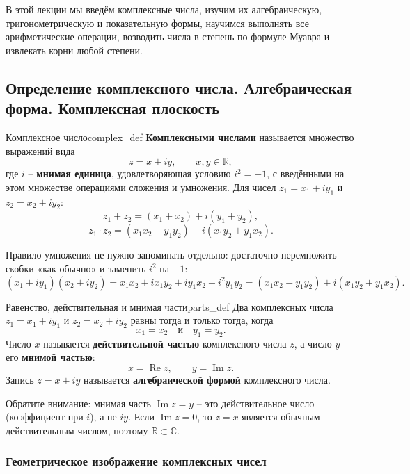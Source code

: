 \documentclass[12pt,a4paper]{article}
\begin{document}
В этой лекции мы введём комплексные числа, изучим их алгебраическую,
тригонометрическую и показательную формы, научимся выполнять все
арифметические операции, возводить числа в степень по формуле Муавра и
извлекать корни любой степени.

\subsection*{Определение комплексного числа. Алгебраическая форма.
Комплексная плоскость}

\begin{definition}{Комплексное число}{complex_def}
  \textbf{Комплексными числами} называется множество выражений вида
  \[
    z = x + iy, \qquad x, y \in \mathbb{R},
  \]
  где $i$ -- \textbf{мнимая единица}, удовлетворяющая условию
  $i^2 = -1$, с введёнными на этом множестве операциями сложения и
  умножения. Для чисел $z_1 = x_1 + iy_1$ и $z_2 = x_2 + iy_2$:
  \[
    z_1 + z_2 = (x_1 + x_2) + i(y_1 + y_2),
  \]
  \[
    z_1 \cdot z_2 = (x_1 x_2 - y_1 y_2) + i(x_1 y_2 + y_1 x_2).
  \]
\end{definition}

Правило умножения не нужно запоминать отдельно: достаточно перемножить
скобки «как обычно» и заменить $i^2$ на $-1$:
\[
  (x_1 + iy_1)(x_2 + iy_2) = x_1 x_2 + i x_1 y_2 + i y_1 x_2 + i^2 y_1 y_2
  = (x_1 x_2 - y_1 y_2) + i(x_1 y_2 + y_1 x_2).
\]

\begin{definition}{Равенство, действительная и мнимая части}{parts_def}
  Два комплексных числа $z_1 = x_1 + iy_1$ и $z_2 = x_2 + iy_2$ равны
  тогда и только тогда, когда
  \[
    x_1 = x_2 \quad \text{и} \quad y_1 = y_2.
  \]
  Число $x$ называется \textbf{действительной частью} комплексного
  числа $z$, а число $y$ -- его \textbf{мнимой частью}:
  \[
    x = \operatorname{Re} z, \qquad y = \operatorname{Im} z.
  \]
  Запись $z = x + iy$ называется \textbf{алгебраической формой}
  комплексного числа.
\end{definition}

Обратите внимание: мнимая часть $\operatorname{Im} z = y$ -- это
действительное число (коэффициент при $i$), а не $iy$. Если
$\operatorname{Im} z = 0$, то $z = x$ является обычным действительным
числом, поэтому $\mathbb{R} \subset \mathbb{C}$.

\subsubsection*{Геометрическое изображение комплексных чисел}
\end{document}
